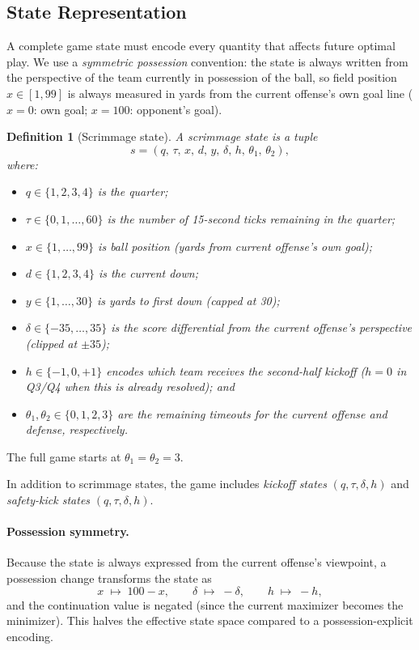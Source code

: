 \documentclass[11pt,letterpaper]{article}
\newtheorem{definition}[theorem]{Definition}
\begin{document}
\subsection{State Representation}

A complete game state must encode every quantity that affects future optimal play.  We
use a \emph{symmetric possession} convention: the state is always written from the
perspective of the team currently in possession of the ball, so field position $x \in
[1,99]$ is always measured in yards from the current offense's own goal line
($x = 0$: own goal; $x = 100$: opponent's goal).

\begin{definition}[Scrimmage state]
A scrimmage state is a tuple
\[
  s = (q,\, \tau,\, x,\, d,\, y,\, \delta,\, h,\, \theta_1,\, \theta_2),
\]
where:
\begin{itemize}
  \item $q \in \{1,2,3,4\}$ is the quarter;
  \item $\tau \in \{0,1,\ldots,60\}$ is the number of 15-second ticks remaining in the quarter;
  \item $x \in \{1,\ldots,99\}$ is ball position (yards from current offense's own goal);
  \item $d \in \{1,2,3,4\}$ is the current down;
  \item $y \in \{1,\ldots,30\}$ is yards to first down (capped at 30);
  \item $\delta \in \{-35,\ldots,35\}$ is the score differential from the current offense's
        perspective (clipped at $\pm 35$);
  \item $h \in \{-1,0,+1\}$ encodes which team receives the second-half kickoff ($h=0$ in
        Q3/Q4 when this is already resolved); and
  \item $\theta_1,\theta_2 \in \{0,1,2,3\}$ are the remaining timeouts for the current
        offense and defense, respectively.
\end{itemize}
\end{definition}

\noindent The full game starts at $\theta_1 = \theta_2 = 3$.

\noindent In addition to scrimmage states, the game includes \emph{kickoff states}
$(q,\tau,\delta,h)$ and \emph{safety-kick states} $(q,\tau,\delta,h)$.

\paragraph{Possession symmetry.}
Because the state is always expressed from the current offense's viewpoint, a possession
change transforms the state as
\[
  x \;\mapsto\; 100 - x, \qquad
  \delta \;\mapsto\; -\delta, \qquad
  h \;\mapsto\; -h,
\]
and the continuation value is negated (since the current maximizer becomes the minimizer).
This halves the effective state space compared to a possession-explicit encoding.
\end{document}
